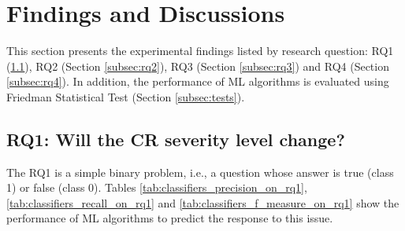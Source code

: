 \section{Findings and Discussions}  \label{sec:discussion}
This section presents the experimental findings listed by research question: RQ1 (\ref{subsec:rq1}), RQ2 (Section \ref{subsec:rq2}), RQ3 (Section \ref{subsec:rq3}) and RQ4 (Section \ref{subsec:rq4}). In addition, the performance of ML algorithms is evaluated using Friedman Statistical Test (Section \ref{subsec:tests}). 

\subsection{RQ1: Will the CR severity level change?}\label{subsec:rq1}

The RQ1 is a simple binary problem, i.e., a question whose answer is true (class 1) or false (class 0). Tables \ref{tab:classifiers_precision_on_rq1}, \ref{tab:classifiers_recall_on_rq1} and \ref{tab:classifiers_f_measure_on_rq1} 
show the performance of ML algorithms to predict the response to this issue.

